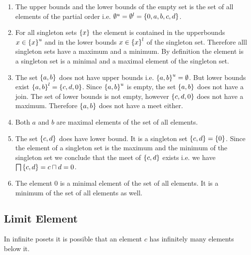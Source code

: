 \begin{enumerate}
    \item The upper bounds and the lower bounds of the empty set is the set of
        all elements of the partial order i.e.  $\emptyset^u = \emptyset^l =
        \left\{0,a,b,c,d\right\}$.

    \item For all singleton sets $\left\{x\right\}$ the element is contained in the
        upperbounds $x \in \left\{x\right\}^u$ and in the lower bounds $x \in \left\{x\right\}^l$
        of the singleton set. Therefore alll singleton sets have a maximum and a
        minimum. By definition the element is a singleton set is a minimal and a
        maximal element of the singleton set.

    \item The set $\left\{a,b\right\}$ does not have upper bounds i.e. $\left\{a,b\right\}^u =
        \emptyset$. But lower bounds exist $\left\{a,b\right\}^l = \left\{c,d,0\right\}$. Since
        $\left\{a,b\right\}^u$ is empty, the set $\left\{a,b\right\}$ does not have a join. The
        set of lower bounds is not empty, however $\left\{c,d,0\right\}$ does not have a
        maximum. Therefore $\left\{a,b\right\}$ does not have a meet either.

    \item
        Both $a$ and $b$ are maximal elements of the set of all elements.

    \item The set $\left\{c,d\right\}$ does have lower bound. It is a singleton set
        $\left\{c,d\right\} = \left\{0\right\}$. Since the element of a singleton set is the
        maximum and the minimum of the singleton set we conclude that the meet
        of $\left\{c,d\right\}$ exists i.e. we have $\bigsqcap \left\{c,d\right\} = c \sqcap d = 0$.

    \item The element $0$ is a minimal element of the set of all elements. It is
        a minimum of the set of all elements as well.
\end{enumerate}






\subsection{Limit Element}

In infinite posets it is possible that an element $c$ has infinitely many
elements below it.



